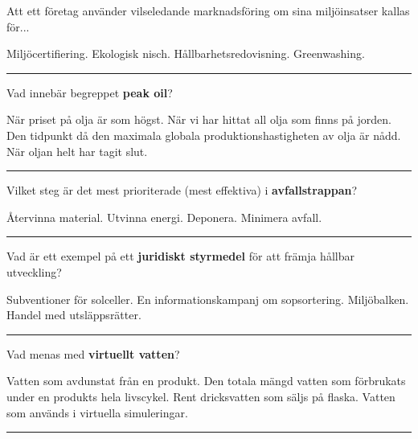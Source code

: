 \documentclass{exam}
\begin{document}
\begin{questions}
\question Att ett företag använder vilseledande marknadsföring om sina miljöinsatser kallas för...
\vspace{2mm}
\begin{checkboxes}
    \choice Miljöcertifiering.
    \choice Ekologisk nisch.
    \choice Hållbarhetsredovisning.
    \choice Greenwashing.
\end{checkboxes}
\vspace{5mm} \hrule \vspace{5mm}
\break
\question Vad innebär begreppet \textbf{peak oil}?
\vspace{2mm}
\begin{checkboxes}
    \choice När priset på olja är som högst.
    \choice När vi har hittat all olja som finns på jorden.
    \choice Den tidpunkt då den maximala globala produktionshastigheten av olja är nådd.
    \choice När oljan helt har tagit slut.
\end{checkboxes}
\vspace{5mm} \hrule \vspace{5mm}

\question Vilket steg är det mest prioriterade (mest effektiva) i \textbf{avfallstrappan}?
\vspace{2mm}
\begin{checkboxes}
    \choice Återvinna material.
    \choice Utvinna energi.
    \choice Deponera.
    \choice Minimera avfall.
\end{checkboxes}
\vspace{5mm} \hrule \vspace{5mm}

\question Vad är ett exempel på ett \textbf{juridiskt styrmedel} för att främja hållbar utveckling?
\vspace{2mm}
\begin{checkboxes}
    \choice Subventioner för solceller.
    \choice En informationskampanj om sopsortering.
    \choice Miljöbalken.
    \choice Handel med utsläppsrätter.
\end{checkboxes}
\vspace{5mm} \hrule \vspace{5mm}

\question Vad menas med \textbf{virtuellt vatten}?
\vspace{2mm}
\begin{checkboxes}
    \choice Vatten som avdunstat från en produkt.
    \choice Den totala mängd vatten som förbrukats under en produkts hela livscykel.
    \choice Rent dricksvatten som säljs på flaska.
    \choice Vatten som används i virtuella simuleringar.
\end{checkboxes}
\vspace{5mm} \hrule \vspace{5mm}


\end{questions}
\end{document}
